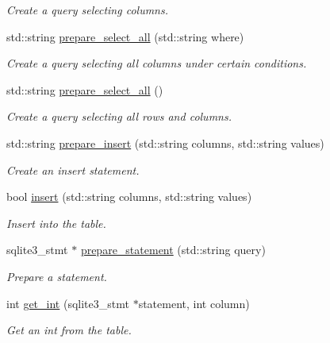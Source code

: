 \begin{DoxyCompactItemize}
\begin{DoxyCompactList}\small\item\em Create a query selecting columns. \end{DoxyCompactList}\item 
std\+::string \hyperlink{class_database_table_abbb3c9bf537c1a2d3227661fec817432}{prepare\+\_\+select\+\_\+all} (std\+::string where)
\begin{DoxyCompactList}\small\item\em Create a query selecting all columns under certain conditions. \end{DoxyCompactList}\item 
std\+::string \hyperlink{class_database_table_ade634681afae1d6dec558c049eb907a9}{prepare\+\_\+select\+\_\+all} ()
\begin{DoxyCompactList}\small\item\em Create a query selecting all rows and columns. \end{DoxyCompactList}\item 
std\+::string \hyperlink{class_database_table_a6fce977a2f3583c2514807e5bec7ccd3}{prepare\+\_\+insert} (std\+::string columns, std\+::string values)
\begin{DoxyCompactList}\small\item\em Create an insert statement. \end{DoxyCompactList}\item 
bool \hyperlink{class_database_table_a91151267d595dd3b6b1f78f0919fd4e5}{insert} (std\+::string columns, std\+::string values)
\begin{DoxyCompactList}\small\item\em Insert into the table. \end{DoxyCompactList}\item 
sqlite3\+\_\+stmt $\ast$ \hyperlink{class_database_table_aa975049890361cdee6d04ddf497e6c07}{prepare\+\_\+statement} (std\+::string query)
\begin{DoxyCompactList}\small\item\em Prepare a statement. \end{DoxyCompactList}\item 
int \hyperlink{class_database_table_ae57f4efec8565b48646579e5459a9077}{get\+\_\+int} (sqlite3\+\_\+stmt $\ast$statement, int column)
\begin{DoxyCompactList}\small\item\em Get an int from the table. \end{DoxyCompactList}\item 

\end{DoxyCompactItemize}
